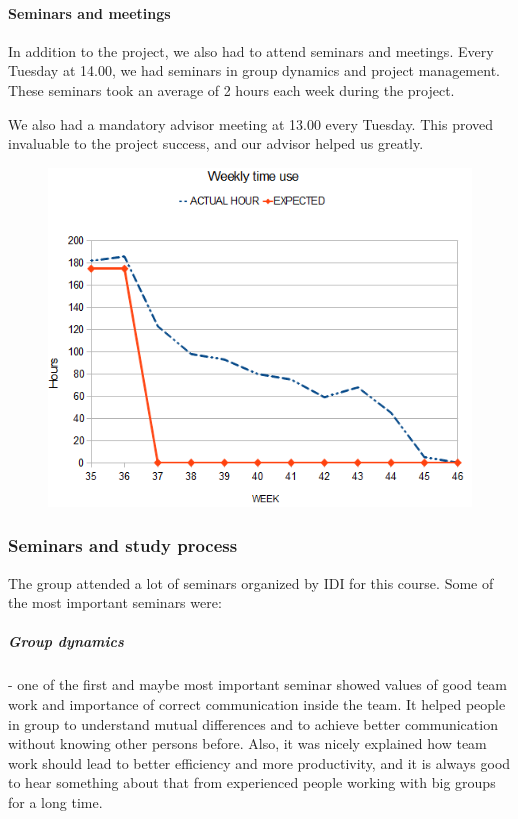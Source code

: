   \paragraph{Seminars and meetings}
  In addition to the project, we also had to attend seminars and meetings. Every
  Tuesday at 14.00, we had seminars in group dynamics and project management.
  These seminars took an average of 2 hours each week during the project. 

  We also had a mandatory advisor meeting at 13.00 every Tuesday. This proved
  invaluable to the project success, and our advisor helped us greatly. 
 	
    \begin{figure}[htb]
        \centering
        \includegraphics[scale=0.88]{timebudget.png}
        \label{fig:time}
    \end{figure}
	
	\subsubsection{Seminars and study process}
  The group attended a lot of seminars organized by IDI for this course. Some of
  the most important seminars were:
	
  \subparagraph{Group dynamics} - one of the first and maybe most important
  seminar showed values of good team work and importance of correct
  communication inside the team. It helped people in group to understand mutual
  differences and to achieve better communication without knowing other persons
  before. Also, it was nicely explained how team work should lead to better
  efficiency and more productivity, and it is always good to hear something
  about that from experienced people working with big groups for a long time.

